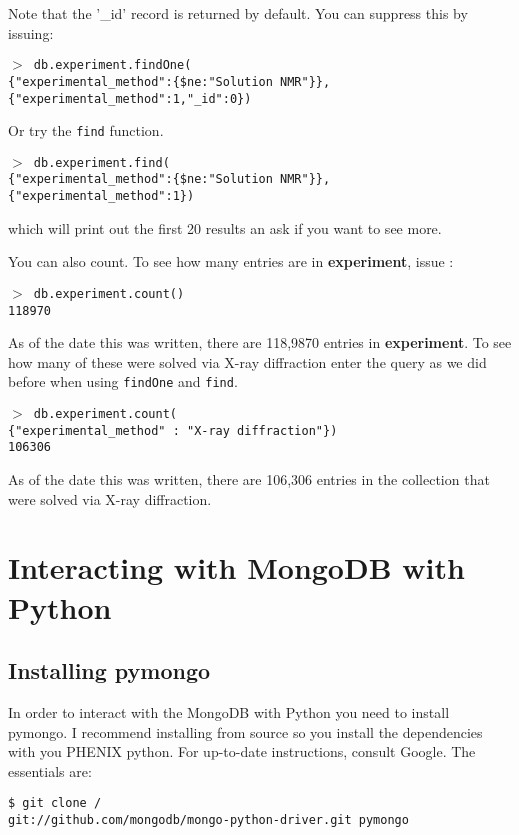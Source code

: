 \documentclass[12pt]{article}
\newcommand{\mdbcmdline}[1]{\vspace{5mm} \noindent
\texttt{$>$ #1}
\vspace{5mm}

}
\newcommand{\mdbcol}[1]{{\color{Bittersweet}\textbf{#1}}}
\begin{document}
\noindent
Note that the '\_id' record is returned by default.
You can suppress this by issuing:

\mdbcmdline{db.experiment.findOne(\\
\{"experimental\_method":\{\$ne:"Solution NMR"\}\}, \\
\{"experimental\_method":1,"\_id":0\})
}
\noindent

Or try the \texttt{find} function.

\mdbcmdline{db.experiment.find(\\
\{"experimental\_method":\{\$ne:"Solution NMR"\}\}, \\
\{"experimental\_method":1\})
}

\noindent
which will print out the first 20 results an ask if you want to see more.

\vspace{5mm}
\noindent
You can also count.
To see how many entries are in \mdbcol{experiment}, issue :

\mdbcmdline{db.experiment.count() \\
118970}

\noindent
As of the date this was written, there are 118,9870 entries in \mdbcol{experiment}.
To see how many of these were solved via X-ray diffraction enter the query as we did before when using \texttt{findOne} and \texttt{find}.

\mdbcmdline{db.experiment.count(\\
\{"experimental\_method" : "X-ray diffraction"\}) \\
106306}

\noindent
As of the date this was written, there are 106,306 entries in the collection that were solved via X-ray diffraction.


\section{Interacting with MongoDB with Python}
\subsection{Installing pymongo}
In order to interact with the MongoDB with Python you need to install pymongo.
I recommend installing from source so you install the dependencies with you PHENIX python.
For up-to-date instructions, consult Google.
The essentials are:

\vspace{5mm}
\noindent
\texttt{\$ git clone / \\
\indent
git://github.com/mongodb/mongo-python-driver.git pymongo}
\end{document}
